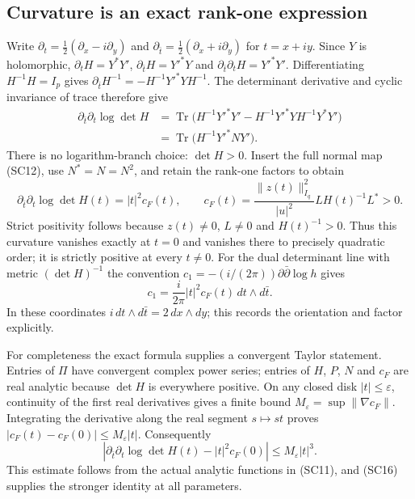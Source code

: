 \documentclass{article}
\begin{document}
\subsection{Curvature is an exact rank-one expression}

Write $\partial_t=\tfrac12(\partial_x-i\partial_y)$ and
$\partial_{\bar t}=\tfrac12(\partial_x+i\partial_y)$ for $t=x+iy$.
Since $Y$ is holomorphic,
$\partial_tH=Y^*Y'$,
$\partial_{\bar t}H=Y'^*Y$ and
$\partial_{\bar t}\partial_tH=Y'^*Y'$.
Differentiating $H^{-1}H=I_p$ gives
$\partial_{\bar t}H^{-1}=-H^{-1}Y'^*YH^{-1}$.
The determinant derivative and cyclic invariance of trace therefore give
\[
\begin{split}
 \partial_{\bar t}\partial_t\log\det H
 &=\operatorname{Tr}\bigl(H^{-1}Y'^*Y'
   -H^{-1}Y'^*YH^{-1}Y^*Y'\bigr)\\
 &=\operatorname{Tr}\bigl(H^{-1}Y'^*N Y'\bigr).
\end{split}\tag{SC15}
\]
There is no logarithm-branch choice: $\det H>0$.
Insert the full normal map (SC12), use $N^*=N=N^2$, and retain
the rank-one factors to obtain
\[
 \boxed{\partial_{\bar t}\partial_t\log\det H(t)
   =|t|^2 c_F(t),\qquad
 c_F(t)=\frac{\|z(t)\|_{I_q}^2}{|u|^2}
                   L H(t)^{-1}L^*>0.}
 \tag{SC16}
\]
Strict positivity follows because $z(t)\ne0$, $L\ne0$ and
$H(t)^{-1}>0$.  Thus this curvature vanishes exactly at $t=0$
and vanishes there to precisely quadratic order; it is strictly
positive at every $t\ne0$.  For the dual determinant line with metric
$(\det H)^{-1}$ the convention
$c_1=-(i/(2\pi))\partial\bar\partial\log h$ gives
\[
 c_1=\frac i{2\pi}|t|^2c_F(t)\,dt\wedge d\bar t.
 \tag{SC17}
\]
In these coordinates $i\,dt\wedge d\bar t=2\,dx\wedge dy$;
this records the orientation and factor explicitly.

For completeness the exact formula supplies a convergent Taylor
statement.  Entries of $\Pi$ have convergent complex power series;
entries of $H$, $P$, $N$ and $c_F$ are real analytic because
$\det H$ is everywhere positive.  On any closed disk
$|t|\leq\varepsilon$, continuity of the first real derivatives gives
a finite bound $M_\varepsilon=\sup\|\nabla c_F\|$.
Integrating the derivative along the real segment $s\mapsto st$ proves
$|c_F(t)-c_F(0)|\leq M_\varepsilon|t|$.  Consequently
\[
 \left|\partial_{\bar t}\partial_t\log\det H(t)
                  -|t|^2c_F(0)\right|
 \leq M_\varepsilon|t|^3.
 \tag{SC18}
\]
This estimate follows from the actual analytic functions in (SC11),
and (SC16) supplies the stronger identity at all parameters.
\end{document}
